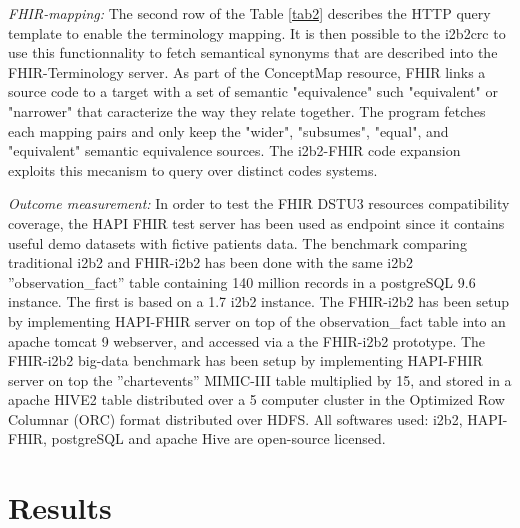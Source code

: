 \documentclass{amia}
\begin{document}
\textit{FHIR-mapping:} The second row of the Table \ref{tab2} describes the HTTP query template to enable the terminology mapping. It is then possible to the i2b2crc to use this functionnality to fetch semantical synonyms that are described into the FHIR-Terminology server. As part of the ConceptMap\cite{ref15} resource, FHIR links a source code to a target with a set of semantic "equivalence" such "equivalent" or "narrower" that caracterize the way they relate together. The program fetches each mapping pairs and only keep the "wider", "subsumes", "equal", and "equivalent" semantic equivalence sources. The i2b2-FHIR code expansion exploits this mecanism to query over distinct codes systems.



\textit{Outcome measurement:} In order to test the FHIR DSTU3 resources compatibility coverage, the HAPI FHIR\cite{HAPI} test server has been used as endpoint since it contains useful demo datasets with fictive patients data. The benchmark comparing traditional i2b2 and FHIR-i2b2 has been done with the same i2b2 ''observation\_fact'' table containing 140 million records in a postgreSQL 9.6 instance. The first is based on a 1.7 i2b2 instance. The FHIR-i2b2 has been setup by implementing HAPI-FHIR server on top of the observation\_fact table into an apache tomcat 9 webserver, and accessed via a the FHIR-i2b2 prototype. The FHIR-i2b2 big-data benchmark has been setup by implementing HAPI-FHIR server on top the ''chartevents'' MIMIC-III\cite{Johnson:SD2016} table multiplied by 15, and stored in a apache HIVE2 table distributed over a 5 computer cluster in the Optimized Row Columnar (ORC) format distributed over HDFS. All softwares used: i2b2, HAPI-FHIR, postgreSQL and apache Hive are open-source licensed.

\section*{Results}
\end{document}
